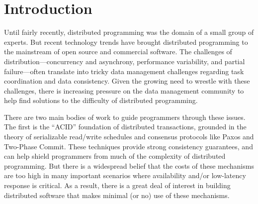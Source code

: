 \section{Introduction}
Until fairly recently, distributed programming was the domain of a small group of experts. But recent technology trends have brought distributed programming to the mainstream of open source and commercial software.  The challenges of distribution---concurrency and asynchrony, performance variability, and partial failure---often translate into tricky data management challenges regarding task coordination and data consistency.
Given the growing need to wrestle with these challenges, there is increasing pressure on the data management community to help find solutions to the difficulty of distributed programming.

There are two main bodies of work to guide programmers through these issues.  The first is the ``ACID'' foundation of distributed transactions, grounded in the theory of serializable read/write schedules and consensus protocols like Paxos and Two-Phase Commit.  These techniques provide strong consistency guarantees, and can help shield programmers from much of the complexity of distributed programming. But there is a widespread belief that the costs of these mechanisms are too high in many important scenarios where availability and/or low-latency response is critical.
As a result, there is a great deal of interest in building distributed software that makes minimal (or no) use of these mechanisms.


